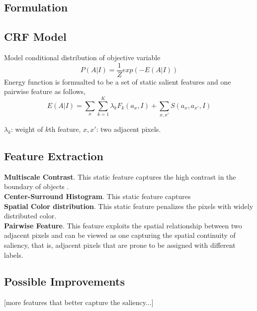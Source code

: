 \documentclass[12pt,a4paper]{article}
\begin{document}
\begin{multicols}{2}
\section{Formulation}
\subsection{CRF Model}
Model conditional distribution of objective variable 
    $$ P(A|I) = \frac{1}{Z} exp(-E(A|I)) $$
Energy function is formualted to be a set of static salient features and one pairwise feature as follows,
    $$ E(A|I) = \sum_{x} \sum_{k=1}^{K} \lambda_{k} F_{k}(a_{x},I)  
        + \sum_{x,x'} S(a_{x},a_{x'},I)  $$ \vspace{-0.4cm}
\begin{center} \footnotesize $\lambda_{k}$: weight of $k$th feature, $x,x'$: two adjacent pixels. \end{center} 

\subsection{Feature Extraction}
\textbf{Multiscale Contrast}. This static feature captures the high contrast in the boundary of objects . \\[0.1cm]
\textbf{Center-Surround Histogram}. This static feature captures  \\[0.1cm]
\textbf{Spatial Color distribution}. This static feature penalizes the pixels with widely distributed color. \\[0.1cm]
\textbf{Pairwise Feature}. This feature exploits the spatial relationship between two adjacent pixels and can be viewed as one capturing the spatial continuity of saliency, that is, adjacent pixels that are prone to be assigned with different labels. 
\subsection{Possible Improvements}
[more features that better capture the saliency...]


\end{multicols}
\end{document}
